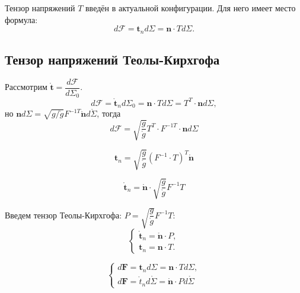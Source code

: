 \begin{remark}
  Тензор напряжений $T$ введён в актуальной конфигурации. Для него имеет место
  формула:
  \[
    d\mathbf{\mathcal{F}} = \mathbf{t}_n d\Sigma = \mathbf{n} \cdot T d\Sigma.
  \]
\end{remark}

\subsection{Тензор напряжений Теолы-Кирхгофа}

Рассмотрим $\mathring{\mathbf{t}} = \dfrac{d\mathbf{\mathcal{F}}}{d\Sigma_0}$.
\[
  d\mathbf{\mathcal{F}} = \mathring{\mathbf{t}}_n d\Sigma_0
  = \mathbf{n} \cdot T d\Sigma = T^T \cdot \mathbf{n} d\Sigma,
\]
но $\mathbf{n} d\Sigma
= \sqrt{g/\mathring{g}} F^{-1T} \mathring{\mathbf{n}} d\mathring{\Sigma}$, 
тогда
\[
  d\mathbf{\mathcal{F}}
  = \sqrt{\dfrac{g}{\mathring{g}}} T^T \cdot F^{-1T} \cdot \mathbf{n} d\Sigma
\]

\[
  \mathbf{t}_n
  = \sqrt{\dfrac{g}{\mathring{g}}} \left( F^{-1} \cdot T \right)^T \mathring{\mathbf{n}}
\]

\[
  \mathring{\mathbf{t}}_n = \mathbf{\mathring{n}} \cdot \sqrt{\dfrac{g}{\mathring{g}}} F^{-1} T
\]

Введем тензор Теолы-Кирхгофа: $P=\sqrt{\dfrac{g}{\mathring{g}}} F^{-1} T$:
\[
  \begin{cases}
    \mathring{\mathbf{t}}_n = \mathring{\mathbf{n}} \cdot P, \\
    \mathbf{t}_n = \mathbf{n} \cdot T.
  \end{cases}
\]

\[
  \begin{cases}
    d\mathbf{F} = \mathbf{t}_n d\Sigma = \mathbf{n} \cdot T d\Sigma, \\
    d\mathbf{F} = \mathring{t}_n d\mathring{\Sigma} = \mathring{\mathbf{n}} \cdot P d\mathring{\Sigma}
  \end{cases}
  
\]
